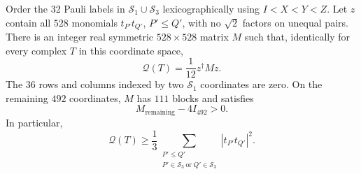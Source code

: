 \begin{lemma}
\label{o2gc:lem-matrix}
Order the 32 Pauli labels in \(\mathcal S_1\cup\mathcal S_3\)
lexicographically using \(I<X<Y<Z\). Let \(z\) contain all
\(528\) monomials \(t_{P'}t_{Q'}\), \(P'\le Q'\), with no
\(\sqrt2\) factors on unequal pairs. There is an integer real
symmetric \(528\times528\) matrix \(M\) such that, identically for
every complex \(T\) in this coordinate space,
\begin{equation}
 \mathcal Q(T)=\frac1{12}z^\dagger Mz.
 \label{o2gc:matrix-identity}
\end{equation}
The \(36\) rows and columns indexed by two \(\mathcal S_1\)
coordinates are zero. On the remaining \(492\) coordinates,
\(M\) has \(111\) blocks and satisfies
\begin{equation}
 M_{\mathrm{remaining}}-4I_{492}>0.
 \label{o2gc:matrix-positive}
\end{equation}
In particular,
\begin{equation}
 \mathcal Q(T)\ge\frac13
 \sum_{\substack{P'\le Q'\\
 P'\in\mathcal S_3\ \text{or}\ Q'\in\mathcal S_3}}
 |t_{P'}t_{Q'}|^2.
 \label{o2gc:coercive}
\end{equation}
\end{lemma}

